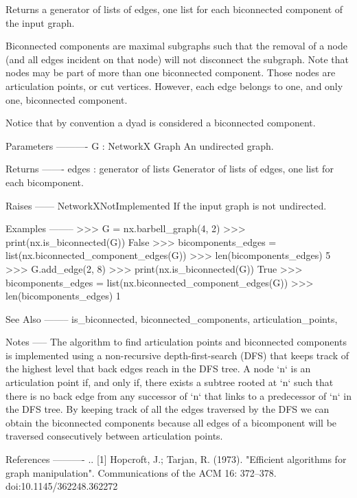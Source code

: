 \begin{DoxyVerb}Returns a generator of lists of edges, one list for each biconnected
component of the input graph.

Biconnected components are maximal subgraphs such that the removal of a
node (and all edges incident on that node) will not disconnect the
subgraph.  Note that nodes may be part of more than one biconnected
component.  Those nodes are articulation points, or cut vertices.
However, each edge belongs to one, and only one, biconnected component.

Notice that by convention a dyad is considered a biconnected component.

Parameters
----------
G : NetworkX Graph
    An undirected graph.

Returns
-------
edges : generator of lists
    Generator of lists of edges, one list for each bicomponent.

Raises
------
NetworkXNotImplemented
    If the input graph is not undirected.

Examples
--------
>>> G = nx.barbell_graph(4, 2)
>>> print(nx.is_biconnected(G))
False
>>> bicomponents_edges = list(nx.biconnected_component_edges(G))
>>> len(bicomponents_edges)
5
>>> G.add_edge(2, 8)
>>> print(nx.is_biconnected(G))
True
>>> bicomponents_edges = list(nx.biconnected_component_edges(G))
>>> len(bicomponents_edges)
1

See Also
--------
is_biconnected,
biconnected_components,
articulation_points,

Notes
-----
The algorithm to find articulation points and biconnected
components is implemented using a non-recursive depth-first-search
(DFS) that keeps track of the highest level that back edges reach
in the DFS tree.  A node `n` is an articulation point if, and only
if, there exists a subtree rooted at `n` such that there is no
back edge from any successor of `n` that links to a predecessor of
`n` in the DFS tree.  By keeping track of all the edges traversed
by the DFS we can obtain the biconnected components because all
edges of a bicomponent will be traversed consecutively between
articulation points.

References
----------
.. [1] Hopcroft, J.; Tarjan, R. (1973).
       "Efficient algorithms for graph manipulation".
       Communications of the ACM 16: 372–378. doi:10.1145/362248.362272\end{DoxyVerb}
 \mbox{\label{namespacenetworkx_1_1algorithms_1_1components_1_1biconnected_a6b7650342e0d90dab9d3256430eab537}} 
